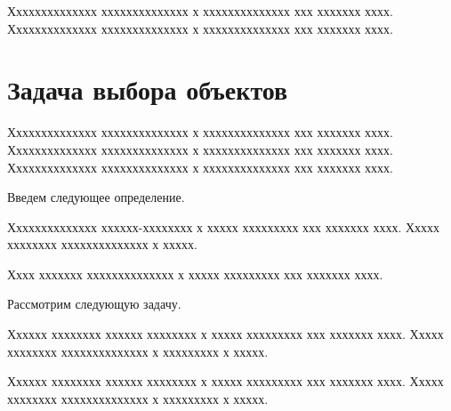 \documentclass[12pt]{a&t}
\begin{document}
Хххххххххххххх хххххххххххххх х хххххххххххххх ххх ххххххх хххх.
Хххххххххххххх хххххххххххххх х хххххххххххххх ххх ххххххх хххх.


\section{Задача выбора объектов}

Хххххххххххххх хххххххххххххх х хххххххххххххх ххх ххххххх хххх.
Хххххххххххххх хххххххххххххх х хххххххххххххх ххх ххххххх хххх.
Хххххххххххххх хххххххххххххх х хххххххххххххх ххх ххххххх хххх.

\begin{comment}
При перечислении можно использовать ненумерованный список:
\begin{itemlist}
\item
ххххххххххххх хххххххххххххх х хххххххххххххх ххх ххххххх хх
ххххххххххххх хххххххххххххх х хххххххххххххх ххх ххххххх хххх;

\item
ххххххххххххх хххххххххххххх х хххххххххххххх ххх ххххххх хххх.
\end{itemlist}
\end{comment}

Введем следующее определение.

\begin{definition}
Хххххххххххххх хххххх-хххххххх х ххххх ххххххххх ххх ххххххх хххх.
Ххххх хххххххх хххххххххххххх х ххххх.
\end{definition}

Хххх ххххххх хххххххххххххх х ххххх ххххххххх ххх ххххххх хххх.

Рассмотрим следующую задачу.

\begin{problem} \label{prob:1}
Хххххх хххххххх хххххх хххххххх х ххххх ххххххххх ххх ххххххх хххх.
Ххххх хххххххх хххххххххххххх х ххххххххх х ххххх.
\end{problem}

Хххххх хххххххх хххххх хххххххх х ххххх ххххххххх ххх ххххххх хххх.
Ххххх хххххххх хххххххххххххх х ххххххххх х ххххх.
\end{document}
